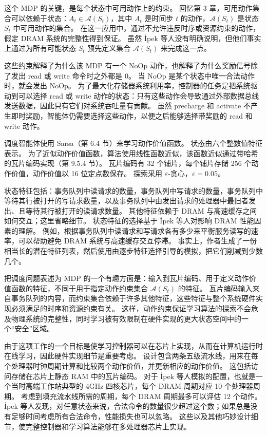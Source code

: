 \documentclass[UTF8, 12pt, fontset=fandol, oneside]{ctexart}
\begin{document}
这个 MDP 的关键，是每个状态中可用动作上的约束。
回忆第 3 章，可用动作集合可以依赖于状态：$A_t\in\mathcal{A}(S_t)$，其中 $A_t$ 是时间步 $t$ 的动作，$\mathcal{A}(S_t)$ 是状态 $S_t$ 中可用动作的集合。
在这一应用中，通过不允许违反时序或资源约束的动作，假定 DRAM 系统的完整性得到保证。
虽然 \.{I}pek 等人没有明确说明，但他们事实上通过为所有可能状态 $S_t$ 预先定义集合 $\mathcal{A}(S_t)$ 来完成这一点。

这些约束解释了为什么该 MDP 有一个 NoOp 动作，也解释了为什么奖励信号除了发出 read 或 write 命令时之外都是 0。
当 NoOp 是某个状态中唯一合法动作时，就会发出 NoOp。
为了最大化存储器系统利用率，控制器的任务是把系统驱动到可以选择 read 或 write 动作的状态：只有这些动作会导致通过外部数据总线发送数据，因此只有它们对系统吞吐量有贡献。
虽然 precharge 和 activate 不产生即时奖励，智能体仍需要选择这些动作，以便之后能够选择带奖励的 read 和 write 动作。

调度智能体使用 Sarsa（第 6.4 节）来学习动作价值函数。
状态由六个整数值特征表示。
为了近似动作价值函数，算法使用线性函数近似，该函数近似通过带哈希的瓦片编码实现（第 9.5.4 节）。
瓦片编码有 32 个铺片，每个铺片存储 256 个动作价值，动作价值以 16 位定点数保存。
探索采用 $\varepsilon$-贪心，$\varepsilon=0.05$。

状态特征包括：事务队列中读请求的数量，事务队列中写请求的数量，事务队列中等待其行被打开的写请求数量，以及事务队列中由发出请求的处理器中最旧者发出、且等待其行被打开的读请求数量。
其他特征依赖于 DRAM 与高速缓存之间如何交互；这里省略细节。
状态特征的选择基于 \.{I}pek 等人对影响 DRAM 性能因素的理解。
例如，根据事务队列中读请求和写请求各有多少来平衡服务读写的速率，可以帮助避免 DRAM 系统与高速缓存交互停滞。
事实上，作者生成了一份相当长的潜在特征列表，然后使用由逐步特征选择引导的模拟，把它们削减到少数几个。

把调度问题表述为 MDP 的一个有趣方面是：输入到瓦片编码、用于定义动作价值函数的特征，不同于用于指定动作约束集合 $\mathcal{A}(S_t)$ 的特征。
瓦片编码输入来自事务队列的内容，而约束集合依赖于许多其他特征，这些特征与整个系统硬件实现必须满足的时序和资源约束有关。
这样，动作约束保证学习算法的探索不会危及物理系统的完整性，同时学习被有效限制在硬件实现的更大状态空间中的一个“安全”区域。

由于这项工作的一个目标是使学习控制器可以在芯片上实现，从而在计算机运行时在线学习，因此硬件实现细节是重要考虑。
设计包含两条五级流水线，用来在每个处理器时钟周期计算和比较两个动作价值，并更新相应的动作价值。
这包括访问存储在芯片上静态 RAM 中的瓦片编码。
对于 \.{I}pek 等人模拟的配置，也就是一个当时高端工作站典型的 4GHz 四核芯片，每个 DRAM 周期对应 10 个处理器周期。
考虑到填充流水线所需的周期，每个 DRAM 周期最多可以评估 12 个动作。
\.{I}pek 等人发现，对任意状态来说，合法命令的数量很少超过这个数；如果总是没有足够时间考虑所有合法命令，性能损失也可以忽略。
这些以及其他巧妙设计细节，使完整控制器和学习算法能够在多处理器芯片上实现。
\end{document}

